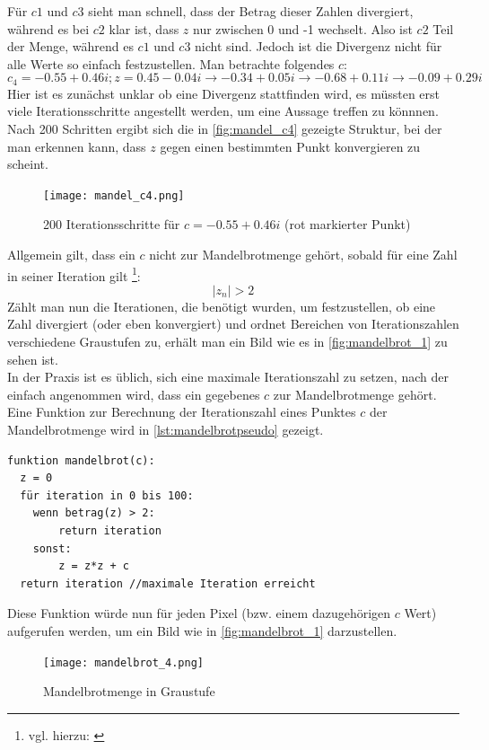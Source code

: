 \documentclass[a4paper,12pt,onesided]{report}
\begin{document}
Für $c1$ und $c3$ sieht man schnell, dass der Betrag dieser Zahlen divergiert, während es bei $c2$ klar ist, dass $z$ nur zwischen 0 und -1 wechselt. Also ist $c2$ Teil der Menge, während es $c1$ und $c3$ nicht sind. Jedoch ist die Divergenz nicht für alle Werte so einfach festzustellen. Man betrachte folgendes $c$:
\[c_4=-0.55 + 0.46i ; z=0.45 - 0.04i \rightarrow -0.34 + 0.05i \rightarrow -0.68 + 0.11i \rightarrow -0.09 + 0.29i\]
Hier ist es zunächst unklar ob eine Divergenz stattfinden wird, es müssten erst viele Iterationsschritte angestellt werden, um eine Aussage treffen zu könnnen. Nach 200 Schritten ergibt sich die in \autoref{fig:mandel_c4} gezeigte Struktur, bei der man erkennen kann, dass $z$ gegen einen bestimmten Punkt konvergieren zu scheint.

\begin{figure}[H]
	\centering
	\texttt{[image: mandel\_c4.png]}
	\caption{200 Iterationsschritte für $c = -0.55 + 0.46i$ (rot markierter Punkt)}
	\label{fig:mandel_c4}
\end{figure}

Allgemein gilt, dass ein $c$ nicht zur Mandelbrotmenge gehört, sobald für eine Zahl in seiner Iteration gilt \footnote{vgl. hierzu: \cite{mbrotg2}}:
\[|z_n|>2\]
Zählt man nun die Iterationen, die benötigt wurden, um festzustellen, ob eine Zahl divergiert (oder eben konvergiert) und ordnet Bereichen von Iterationszahlen verschiedene Graustufen zu, erhält man ein Bild wie es in \autoref{fig:mandelbrot_1} zu sehen ist.\\
In der Praxis ist es üblich, sich eine maximale Iterationszahl zu setzen, nach der einfach angenommen wird, dass ein gegebenes $c$ zur Mandelbrotmenge gehört.\\
Eine Funktion zur Berechnung der Iterationszahl eines Punktes $c$ der Mandelbrotmenge wird in \autoref{lst:mandelbrotpseudo} gezeigt.

\begin{lstlisting}[label=lst:mandelbrotpseudo,caption=Algorithmus zur Berechnung der Iterationszahl eines $c$]
funktion mandelbrot(c):
  z = 0
  für iteration in 0 bis 100:
 	wenn betrag(z) > 2:
 		return iteration
 	sonst:	
		z = z*z + c
  return iteration //maximale Iteration erreicht
\end{lstlisting}

Diese Funktion würde nun für jeden Pixel (bzw. einem dazugehörigen $c$ Wert) aufgerufen werden, um ein Bild wie in \autoref{fig:mandelbrot_1} darzustellen.

\begin{figure}[H]
	\centering
	\texttt{[image: mandelbrot\_4.png]}
	\caption{Mandelbrotmenge in Graustufe}
	\label{fig:mandelbrot_1}
\end{figure}
\end{document}
